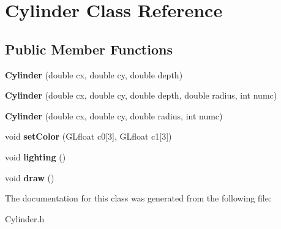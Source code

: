\hypertarget{class_cylinder}{}\section{Cylinder Class Reference}
\label{class_cylinder}
\subsection*{Public Member Functions}
\begin{DoxyCompactItemize}
\item 
\mbox{\label{class_cylinder_a9a1e51eb9eada3c894a2fccc9a6dcf5a}} 
{\bfseries Cylinder} (double cx, double cy, double depth)
\item 
\mbox{\label{class_cylinder_a5e660df9688ae3675b7e368da0cc1dd2}} 
{\bfseries Cylinder} (double cx, double cy, double depth, double radius, int numc)
\item 
\mbox{\label{class_cylinder_a44a1bd72e100d72e8419c3b2f589e2bf}} 
{\bfseries Cylinder} (double cx, double cy, double radius, int numc)
\item 
\mbox{\label{class_cylinder_a1140cf9d4d125eba323a5067b2bc6e7c}} 
void {\bfseries set\+Color} (G\+Lfloat c0\mbox{[}3\mbox{]}, G\+Lfloat c1\mbox{[}3\mbox{]})
\item 
\mbox{\label{class_cylinder_af7fc0a5e40d1a84563f94ee5de1e2838}} 
void {\bfseries lighting} ()
\item 
\mbox{\label{class_cylinder_a89992ad8e5aff4f40a5f496076ff4d52}} 
void {\bfseries draw} ()
\end{DoxyCompactItemize}


The documentation for this class was generated from the following file\+:\begin{DoxyCompactItemize}
\item 
Cylinder.\+h\end{DoxyCompactItemize}
